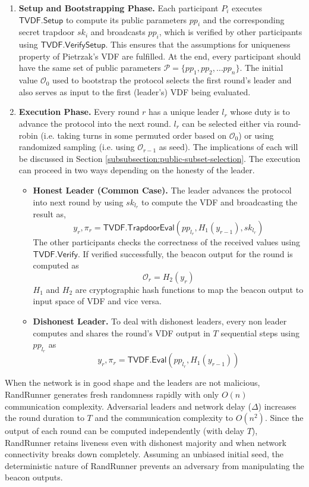 \documentclass[letterpaper,twocolumn,10pt]{article}
\theoremstyle{definition}
\theoremstyle{remark}
\begin{document}
\begin{enumerate}
    \item \textbf{Setup and Bootstrapping Phase.} Each participant $P_i$ executes $\mathsf{TVDF.Setup}$ to compute its public parameters $pp_i$ and the corresponding secret trapdoor $sk_i$ and broadcasts $pp_i$, which is verified by other participants using $\mathsf{TVDF.VerifySetup}$. This ensures that the assumptions for uniqueness property of Pietrzak’s VDF \cite{pietrzak2018simple} are fulfilled. At the end, every participant should have the same set of public parameters $\mathcal{P} = \{ pp_1, pp_2, \ldots pp_n \}$. The initial value $\mathcal{O}_0$ used to bootstrap the protocol selects the first round's leader and also serves as input to the first (leader’s) VDF  being evaluated.
    
    \item \textbf{Execution Phase.} Every round $r$ has a unique leader $l_r$ whose duty is to advance the protocol into the next round. $l_r$ can be selected either via round-robin (i.e. taking turns in some permuted order based on $\mathcal{O}_0$) or using randomized sampling (i.e. using $\mathcal{O}_{r-1}$ as seed). The implications of each will be discussed in Section \ref{subsubsection:public-subset-selection}. The execution can proceed in two ways depending on the honesty of the leader.
    \begin{itemize}
        \item \textbf{Honest Leader (Common Case).} The leader advances the protocol into next round by using $sk_{l_r}$ to compute the VDF and broadcasting the result as,
        $$y_r, \pi_r = \mathsf{TVDF.TrapdoorEval}(pp_{l_r}, H_1(y_{r-1}), sk_{l_r})$$
        The other participants checks the correctness of the received values using $\mathsf{TVDF.Verify}$. If verified successfully, the beacon output for the round is computed as 
        $$\mathcal{O}_r = H_2(y_r)$$
        $H_1$ and $H_2$ are cryptographic hash functions to map the beacon output to input space of VDF and vice versa.
        \item \textbf{Dishonest Leader.} To deal with dishonest leaders, every non leader computes and shares the round's VDF output in $T$ sequential steps using $pp_{l_r}$ as
        $$y_r, \pi_r = \mathsf{TVDF.Eval}(pp_{l_r}, H_1(y_{r-1}))$$
    \end{itemize}
\end{enumerate}
When the network is in good shape and the leaders are not malicious, RandRunner generates fresh randomness rapidly with only $O(n)$ communication complexity. Adversarial leaders and network delay ($\Delta$) increases the round duration to $T$ and the communication complexity to $O(n^2)$. Since the output of each round can be computed independently (with delay $T$), RandRunner retains liveness even with dishonest majority and when network connectivity breaks down completely. Assuming an unbiased initial seed, the deterministic nature of RandRunner prevents an adversary from manipulating the beacon outputs. 
\end{document}
